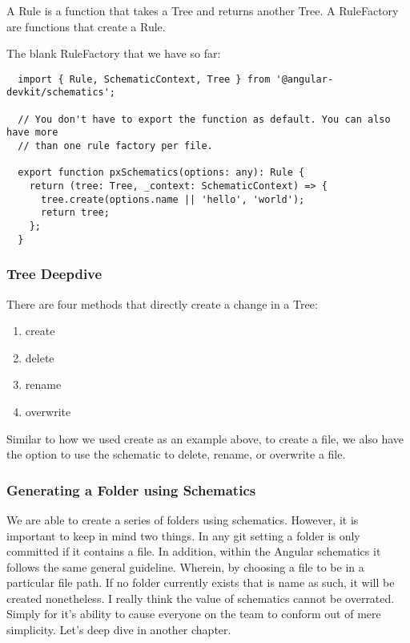 A Rule is a function that takes a Tree and returns another Tree. A RuleFactory
are functions that create a Rule.

The blank RuleFactory that we have so far:

\begin{lstlisting}
  import { Rule, SchematicContext, Tree } from '@angular-devkit/schematics';

  // You don't have to export the function as default. You can also have more
  // than one rule factory per file.

  export function pxSchematics(options: any): Rule {
    return (tree: Tree, _context: SchematicContext) => {
      tree.create(options.name || 'hello', 'world');
      return tree;
    };
  }

\end{lstlisting}


\subsubsection{ Tree Deepdive}
There are four methods that directly create a change in a Tree:
\begin{enumerate}
  \item create
  \item delete
  \item rename
  \item overwrite
\end{enumerate}

Similar to how we used create as an example above, to create a file, we also
have the option to use the schematic to delete, rename, or overwrite a file.

\subsubsection{ Generating a Folder using Schematics }
We are able to create a series of folders using schematics. However, it is
important to keep in mind two things. In any git setting a folder is only
committed if it contains a file. In addition, within the Angular schematics
it follows the same general guideline. Wherein, by choosing a file to be in a
particular file path. If no folder currently exists that is name as such, it
will be created nonetheless. I really think the value of schematics cannot be
overrated. Simply for it's ability to cause everyone on the team to conform out
of mere simplicity. Let's deep dive in another chapter.
